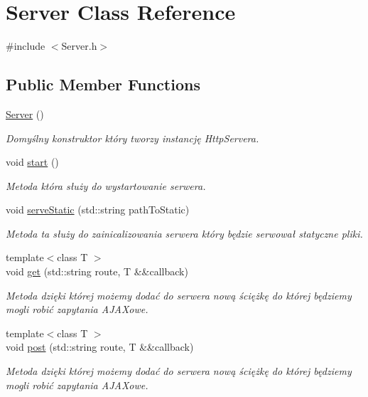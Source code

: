 \hypertarget{classServer}{}\section{Server Class Reference}
\label{classServer}


{\ttfamily \#include $<$Server.\+h$>$}

\subsection*{Public Member Functions}
\begin{DoxyCompactItemize}
\item 
\hyperlink{classServer_ad5ec9462b520e59f7ea831e157ee5e59}{Server} ()\hypertarget{classServer_ad5ec9462b520e59f7ea831e157ee5e59}{}\label{classServer_ad5ec9462b520e59f7ea831e157ee5e59}

\begin{DoxyCompactList}\small\item\em Domyślny konstruktor który tworzy instancję Http\+Servera. \end{DoxyCompactList}\item 
void \hyperlink{classServer_a7eac07d2582fa01c2671362efa955b31}{start} ()\hypertarget{classServer_a7eac07d2582fa01c2671362efa955b31}{}\label{classServer_a7eac07d2582fa01c2671362efa955b31}

\begin{DoxyCompactList}\small\item\em Metoda która służy do wystartowanie serwera. \end{DoxyCompactList}\item 
void \hyperlink{classServer_a45cfd15f8890373ffcbed86c186d1aaa}{serve\+Static} (std\+::string path\+To\+Static)
\begin{DoxyCompactList}\small\item\em Metoda ta służy do zainicalizowania serwera który będzie serwował statyczne pliki. \end{DoxyCompactList}\item 
{\footnotesize template$<$class T $>$ }\\void \hyperlink{classServer_a859a8c496ff0caf27e7812d49e2ff980}{get} (std\+::string route, T \&\&callback)
\begin{DoxyCompactList}\small\item\em Metoda dzięki której możemy dodać do serwera nową ściężkę do której będziemy mogli robić zapytania A\+J\+A\+Xowe. \end{DoxyCompactList}\item 
{\footnotesize template$<$class T $>$ }\\void \hyperlink{classServer_a0cfbd63c4bd68875744b834cbe8f4b91}{post} (std\+::string route, T \&\&callback)
\begin{DoxyCompactList}\small\item\em Metoda dzięki której możemy dodać do serwera nową ściężkę do której będziemy mogli robić zapytania A\+J\+A\+Xowe. \end{DoxyCompactList}\end{DoxyCompactItemize}


